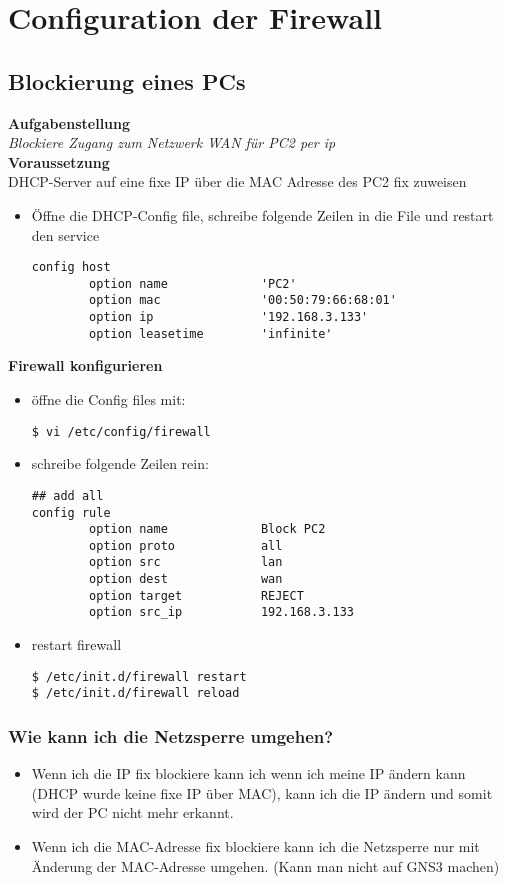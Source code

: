 \section{Configuration der Firewall}
\subsection{Blockierung eines PCs}
\textbf{Aufgabenstellung}\\
\textit{Blockiere Zugang zum Netzwerk WAN für PC2 per ip}\\
\textbf{Voraussetzung}\\
DHCP-Server auf eine fixe IP über die MAC Adresse des PC2 fix zuweisen
\begin{itemize}
\item Öffne die DHCP-Config file, schreibe folgende Zeilen in die File und restart den service
\begin{verbatim}
config host
        option name				'PC2'
        option mac				'00:50:79:66:68:01'
        option ip				'192.168.3.133'
        option leasetime 		'infinite'
\end{verbatim}
\end{itemize}
\textbf{Firewall konfigurieren}
\begin{itemize}
\item öffne die Config files mit:
\begin{verbatim}
$ vi /etc/config/firewall
\end{verbatim}
\item schreibe folgende Zeilen rein:
\begin{verbatim}
## add all
config rule                                         
        option name             Block PC2           
        option proto            all                 
        option src              lan                 
        option dest             wan                 
        option target           REJECT              
        option src_ip           192.168.3.133  
\end{verbatim}
\item restart firewall
\begin{verbatim}
$ /etc/init.d/firewall restart
$ /etc/init.d/firewall reload
\end{verbatim}
\end{itemize}


\subsubsection{Wie kann ich die Netzsperre umgehen?}
\begin{itemize}
\item Wenn ich die IP fix blockiere kann ich wenn ich meine IP ändern kann (DHCP wurde keine fixe IP über MAC), kann ich die IP ändern und somit wird der PC nicht mehr erkannt.
\item Wenn ich die MAC-Adresse fix blockiere kann ich die Netzsperre nur mit Änderung der MAC-Adresse umgehen. (Kann man nicht auf GNS3 machen) 
\end{itemize}




